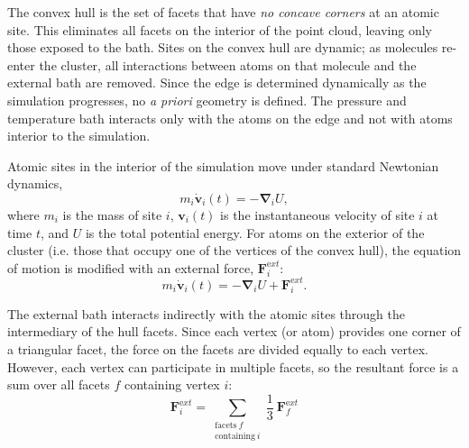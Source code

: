 \documentclass[letterpaper]{report}
\begin{document}
The convex hull is the set of facets that have {\it no concave
  corners} at an atomic site.\cite{Barber96,EDELSBRUNNER:1994oq} This
eliminates all facets on the interior of the point cloud, leaving only
those exposed to the bath. Sites on the convex hull are dynamic; as
molecules re-enter the cluster, all interactions between atoms on that
molecule and the external bath are removed.  Since the edge is
determined dynamically as the simulation progresses, no {\it a priori}
geometry is defined. The pressure and temperature bath interacts only
with the atoms on the edge and not with atoms interior to the
simulation.

Atomic sites in the interior of the simulation move under standard
Newtonian dynamics,
\begin{equation}
m_i \dot{\mathbf v}_i(t)=-{\mathbf \nabla}_i U,
\label{eq:Newton}
\end{equation}
where $m_i$ is the mass of site $i$, ${\mathbf v}_i(t)$ is the
instantaneous velocity of site $i$ at time $t$, and $U$ is the total
potential energy.  For atoms on the exterior of the cluster
(i.e. those that occupy one of the vertices of the convex hull), the
equation of motion is modified with an external force, ${\mathbf
  F}_i^{\mathrm ext}$:
\begin{equation}
m_i \dot{\mathbf v}_i(t)=-{\mathbf \nabla}_i U + {\mathbf F}_i^{\mathrm ext}.
\end{equation}

The external bath interacts indirectly with the atomic sites through
the intermediary of the hull facets.  Since each vertex (or atom)
provides one corner of a triangular facet, the force on the facets are
divided equally to each vertex.  However, each vertex can participate
in multiple facets, so the resultant force is a sum over all facets
$f$ containing vertex $i$:
\begin{equation}
{\mathbf F}_{i}^{\mathrm ext} = \sum_{\begin{array}{c}\mathrm{facets\
    } f \\ \mathrm{containing\ } i\end{array}} \frac{1}{3}\  {\mathbf
  F}_f^{\mathrm ext}
\end{equation}
\end{document}
